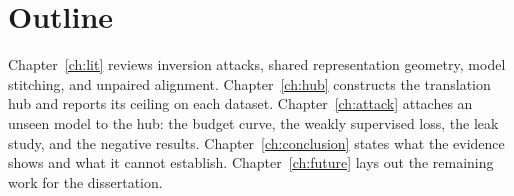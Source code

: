 \section{Outline}\label{sec:intro:outline}

Chapter~\ref{ch:lit} reviews inversion attacks, shared representation geometry, model stitching, and unpaired alignment. Chapter~\ref{ch:hub} constructs the translation hub and reports its ceiling on each dataset. Chapter~\ref{ch:attack} attaches an unseen model to the hub: the budget curve, the weakly supervised loss, the leak study, and the negative results. Chapter~\ref{ch:conclusion} states what the evidence shows and what it cannot establish. Chapter~\ref{ch:future} lays out the remaining work for the dissertation.
